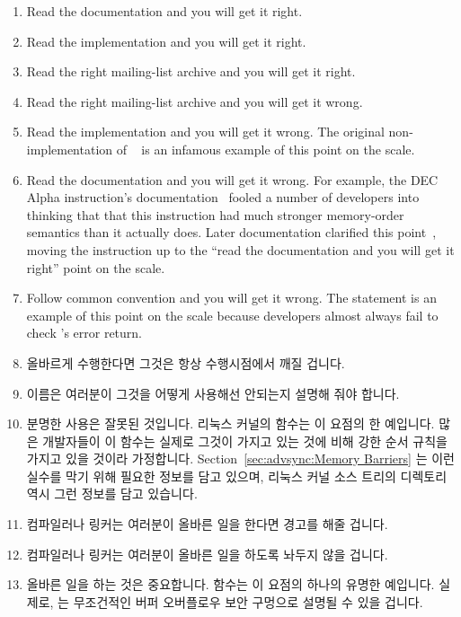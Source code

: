 \begin{enumerate}
\item	Read the documentation and you will get it right.
\item	Read the implementation and you will get it right.
\item	Read the right mailing-list archive and you will get it right.
\item	Read the right mailing-list archive and you will get it wrong.
\item	Read the implementation and you will get it wrong.
	The original non- implementation of
	~\cite{PaulEMcKenney2007PreemptibleRCU}
	is an infamous example of this point on the scale.
\item	Read the documentation and you will get it wrong.
	For example, the DEC Alpha  instruction's
	documentation~\cite{ALPHA95} fooled a
	number of developers into thinking that that this instruction
	had much stronger memory-order semantics than it actually does.
	Later documentation clarified this point~\cite{Compaq01},
	moving the  instruction up to the
	``read the documentation and you will get it right'' point on
	the scale.
\item	Follow common convention and you will get it wrong.
	The  statement is an example of this point on the
	scale because
	developers almost always fail to check 's error return.
\fi
\item	올바르게 수행한다면 그것은 항상 수행시점에서 깨질 겁니다.
\item	이름은 여러분이 그것을 어떻게 사용해선 안되는지 설명해 줘야 합니다.
\item	분명한 사용은 잘못된 것입니다.
	리눅스 커널의  함수는 이 요점의 한 예입니다.
	많은 개발자들이 이 함수는 실제로 그것이 가지고 있는 것에 비해 강한 순서
	규칙을 가지고 있을 것이라 가정합니다.
	Section~\ref{sec:advsync:Memory Barriers} 는 이런 실수를 막기 위해
	필요한 정보를 담고 있으며, 리눅스 커널 소스 트리의 
	디렉토리 역시 그런 정보를 담고 있습니다.
\item	컴파일러나 링커는 여러분이 올바른 일을 한다면 경고를 해줄 겁니다.
\item	컴파일러나 링커는 여러분이 올바른 일을 하도록 놔두지 않을 겁니다.
\item	올바른 일을 하는 것은 중요합니다.
	 함수는 이 요점의 하나의 유명한 예입니다.
	실제로,  는 무조건적인 버퍼 오버플로우 보안 구멍으로 설명될
	수 있을 겁니다.
\iffalse


\end{enumerate}
